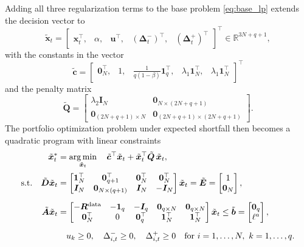 Adding all three regularization terms to the base problem \eqref{eq:base_lp} extends the decision vector to
\begin{equation*}
    \tilde{\bm{x}}_t = \begin{bmatrix} \bm{x}_t^\top,& \alpha,& \bm{u}^\top,& (\bm{\Delta}_t^-)^\top,& (\bm{\Delta}_t^+)^\top \end{bmatrix}^\top
    \in \mathbb{R}^{3N+q+1},
\end{equation*}
with the constants in the vector
\begin{equation*}
    \tilde{\bm{c}} = \begin{bmatrix} \bm{0}_N^\top,& 1,& \tfrac{1}{q(1-\beta)} \bm{1}_q^\top,& \lambda_1 \bm{1}_N^\top,& \lambda_1 \bm{1}_N^\top \end{bmatrix}^\top
\end{equation*}
and the penalty matrix
\begin{equation*}
    \tilde{\bm{Q}} =
    \begin{bmatrix}
        \lambda_2 \bm{I}_N & \bm{0}_{N \times (2N+q+1)} \\
        \bm{0}_{(2N+q+1) \times N} & \bm{0}_{(2N+q+1) \times (2N+q+1)}
    \end{bmatrix}.
\end{equation*}
The portfolio optimization problem under expected shortfall then becomes a quadratic program with linear constraints
\begin{equation} \label{eq:reg_qp}
\begin{aligned}
    \tilde{\bm{x}}_t^* &= \operatorname*{arg\,min}_{\tilde{\bm{x}}_t} \quad
    \tilde{\bm{c}}^\top \tilde{\bm{x}}_t +  \tilde{\bm{x}}_t^\top \tilde{\bm{Q}}\, \tilde{\bm{x}}_t, \\[2pt]
    \text{s.t.} \quad
     \tilde{\bm{D}} \tilde{\bm{x}}_t &=
    \begin{bmatrix} \bm{1}_N^\top & \bm{0}_{q+1}^\top & \bm{0}_N^\top & \bm{0}_N^\top \\
    \bm{I}_N & \bm{0}_{N \times (q+1)} & \bm{I}_N & -\bm{I}_N \end{bmatrix} \tilde{\bm{x}}_t
    = \tilde{\bm{E}} = \begin{bmatrix} 1 \\ \bm{0}_N \end{bmatrix}, \\[6pt]
     \tilde{\bm{A}} \tilde{\bm{x}}_t &=
    \begin{bmatrix} -\bm{R}^{\text{data}} & -\bm{1}_q & -\bm{I}_q & \bm{0}_{q \times N} & \bm{0}_{q \times N} \\
    \bm{0}_N^\top & 0 & \bm{0}_q^\top & \bm{1}_N^\top & \bm{1}_N^\top \end{bmatrix} \tilde{\bm{x}}_t
    \le \tilde{\bm{b}} = \begin{bmatrix} \bm{0}_q \\ \ell^a \end{bmatrix}, \\[6pt]
     & \quad u_k \ge 0,\quad \Delta_{i,t}^- \ge 0,\quad \Delta_{i,t}^+ \ge 0
    \quad \text{for } i = 1, \dots, N,\ k = 1, \dots, q.
\end{aligned}
\end{equation}
